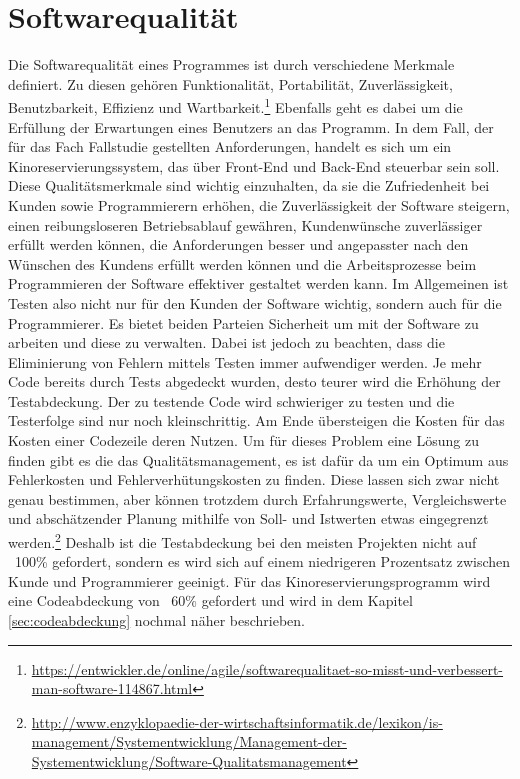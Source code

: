 \section{Softwarequalität}

Die Softwarequalität eines Programmes ist durch verschiedene Merkmale definiert. Zu diesen gehören Funktionalität, Portabilität, Zuverlässigkeit, Benutzbarkeit, Effizienz und Wartbarkeit.\footnote{\url{https://entwickler.de/online/agile/softwarequalitaet-so-misst-und-verbessert-man-software-114867.html}}
Ebenfalls geht es dabei um die Erfüllung der Erwartungen eines Benutzers an das Programm. In dem Fall, der für das Fach Fallstudie gestellten Anforderungen, handelt es sich um ein Kinoreservierungssystem, das über Front-End und Back-End steuerbar sein soll.
Diese Qualitätsmerkmale sind wichtig einzuhalten, da sie die Zufriedenheit bei Kunden sowie Programmierern erhöhen, die Zuverlässigkeit der Software steigern, einen reibungsloseren Betriebsablauf gewähren, Kundenwünsche zuverlässiger erfüllt werden können, die Anforderungen besser und angepasster nach den Wünschen des Kundens erfüllt werden können und die Arbeitsprozesse beim Programmieren der Software effektiver gestaltet werden kann.
Im Allgemeinen ist Testen also nicht nur für den Kunden der Software wichtig, sondern auch für die Programmierer. 
Es bietet beiden Parteien Sicherheit um mit der Software zu arbeiten und diese zu verwalten. 
Dabei ist jedoch zu beachten, dass die Eliminierung von Fehlern mittels Testen immer aufwendiger werden.
Je mehr Code bereits durch Tests abgedeckt wurden, desto teurer wird die Erhöhung der Testabdeckung. Der zu testende Code wird schwieriger zu testen und die Testerfolge sind nur noch kleinschrittig. Am Ende übersteigen die Kosten für das Kosten einer Codezeile deren Nutzen. Um für dieses Problem eine Lösung zu finden gibt es die das Qualitätsmanagement, es ist dafür da um ein Optimum aus Fehlerkosten und Fehlerverhütungskosten zu finden. Diese lassen sich zwar nicht genau bestimmen, aber können trotzdem durch Erfahrungswerte, Vergleichswerte und abschätzender Planung mithilfe von Soll- und Istwerten etwas eingegrenzt werden.\footnote{\url{http://www.enzyklopaedie-der-wirtschaftsinformatik.de/lexikon/is-management/Systementwicklung/Management-der-Systementwicklung/Software-Qualitatsmanagement}} Deshalb ist die Testabdeckung bei den meisten Projekten nicht auf ~100\% gefordert, sondern es wird sich auf einem niedrigeren Prozentsatz zwischen Kunde und Programmierer geeinigt. Für das Kinoreservierungsprogramm wird eine Codeabdeckung von ~60\% gefordert und wird in dem Kapitel \vref{sec:codeabdeckung} nochmal näher beschrieben.
